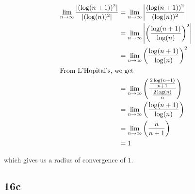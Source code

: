 \documentclass[12pt,letterpaper]{article}
\theoremstyle{definition}
\begin{document}
\begin{align*}
  \lim_{n \rightarrow \infty} \frac{|(\log(n+1))^2|}{|(\log(n))^2|} &= \lim_{n \rightarrow \infty} \left|\frac{(\log(n+1))^2}{(\log(n))^2}\right| \\
                                                                    &= \lim_{n \rightarrow \infty} \left|\left(\frac{\log(n+1)}{\log(n)}\right)^2\right| \\
                                                                    &= \lim_{n \rightarrow \infty} \left(\frac{\log(n+1)}{\log(n)}\right)^2 \\
                                                                    \intertext{From L'Hopital's, we get}
                                                                    &= \lim_{n \rightarrow \infty} \left(\frac{\frac{2\log(n+1)}{n+1}}{\frac{2\log(n)}{n}}\right) \\
                                                                    &= \lim_{n \rightarrow \infty} \left(\frac{\log(n+1)}{\log(n)}\right) \\
                                                                    &= \lim_{n \rightarrow \infty} \left(\frac{n}{n+1}\right) \\
                                                                    &= 1
\end{align*}

which gives us a radius of convergence of $1$.

\subsection*{16c}
\end{document}
